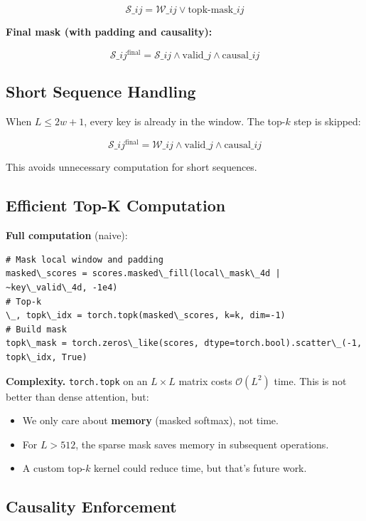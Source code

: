 \[
\mathcal{S}\_{ij} = \mathcal{W}\_{ij} \lor \text{topk-mask}\_{ij}
\tag{4.6}
\]

\textbf{Final mask (with padding and causality):}

\[
\mathcal{S}\_{ij}^\text{final} = \mathcal{S}\_{ij} \land \text{valid}\_j \land \text{causal}\_{ij}
\tag{4.7}
\]

\subsection{Short Sequence Handling}

When $L \leq 2w + 1$, every key is already in the window. The top-$k$ step 
is skipped:

\[
\mathcal{S}\_{ij}^\text{final} = \mathcal{W}\_{ij} \land \text{valid}\_j \land \text{causal}\_{ij}
\tag{4.8}
\]

This avoids unnecessary computation for short sequences.

\subsection{Efficient Top-K Computation}

\textbf{Full computation} (naive):

\begin{lstlisting}
# Mask local window and padding
masked\_scores = scores.masked\_fill(local\_mask\_4d | ~key\_valid\_4d, -1e4)
# Top-k
\_, topk\_idx = torch.topk(masked\_scores, k=k, dim=-1)
# Build mask
topk\_mask = torch.zeros\_like(scores, dtype=torch.bool).scatter\_(-1, topk\_idx, True)
\end{lstlisting}

\textbf{Complexity.} \texttt{torch.topk} on an $L \times L$ matrix costs 
$\mathcal{O}(L^2)$ time. This is not better than dense attention, but:

\begin{itemize}
\item We only care about \textbf{memory} (masked softmax), not time.
\item For $L > 512$, the sparse mask saves memory in subsequent operations.
\item A custom top-$k$ kernel could reduce time, but that's future work.

\end{itemize}
\subsection{Causality Enforcement}

